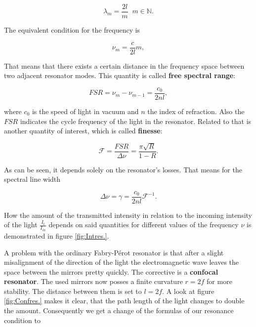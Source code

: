\begin{equation}
\label{E:Deltaj}
\lambda_{m}=\frac{2l}{m} \;\; m \in \mathbb{N}.
\end{equation}

\noindent
The equivalent condition for the frequency is

\begin{equation}
\label{E:Deltaj}
\nu_{m}=\frac{c}{2l}m,
\end{equation}

\noindent
That means that there exists a certain distance in the frequency space between two adjacent resonator modes. This quantity is called \textbf{free spectral range}:

\begin{equation}
\label{E:Deltaj}
FSR=\nu_{m}-\nu_{m-1}=\frac{c_{0}}{2nl},
\end{equation}

\noindent
where $c_{0}$ is the speed of light in vacuum and $n$ the index of refraction. Also the $FSR$ indicates the cycle frequency of the light in the resonator. Related to that is another quantity of interest, which is called \textbf{finesse}:

\begin{equation}
\label{E:Deltaj}
\mathcal{F}=\frac{FSR}{\Delta\nu}=\frac{\pi\sqrt{R}}{1-R}.
\end{equation}

\noindent
As can be seen, it depends solely on the resonator's losses. That means for the spectral line width

\begin{equation}
\label{E:speclinwid}
\Delta\nu=\gamma=\frac{c_{0}}{2nl}\mathcal{F}^{-1}.
\end{equation}

\noindent
How the amount of the transmitted intensity in relation to the incoming intensity of the light $\frac{I_{t}}{I_{in}}$ depends on said quantities for different values of the frequency $\nu$ is demonstrated in figure \ref{fig:Intres.}. 

A problem with the ordinary Fabry-Pérot resonator is that after a slight misalignment of the direction of the light the electromagnetic wave leaves the space between the mirrors pretty quickly. The corrective is a \textbf{confocal resonator}. The used mirrors now posses a finite curvature $r=2f$ for more stability. The distance between them is set to $l=2f$. A look at figure \ref{fig:Confres.} makes it clear, that the path length of the light changes to double the amount. Consequently we get a change of the formulas of our resonance condition to

